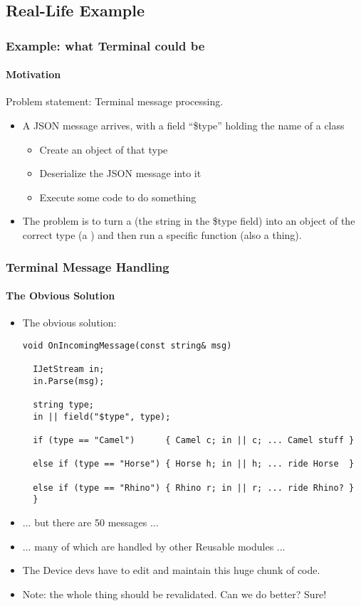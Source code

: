 \subsection{Real-Life Example}

\begin{frame}[fragile,t]
\frametitle{Example: what Terminal could be}
\framesubtitle{Motivation}
Problem statement: Terminal message processing.
\begin{itemize}[<+->]
\item A JSON message arrives, with a field ``\$type'' holding the name
  of a class
  \begin{itemize}
  \item Create an object of that type
  \item Deserialize the JSON message into it
  \item Execute some code to do something
  \end{itemize}
\item The problem is to turn a  (the string in the \$type
  field) into an object of the correct type (a ) and then run a specific function (also a
   thing).
\end{itemize}
\end{frame}

\begin{frame}[fragile,t]
\frametitle{Terminal Message Handling}
\framesubtitle{The Obvious Solution}
\begin{itemize}[<+->]
\item The obvious solution:
{\scriptsize\begin{verbatim}
void OnIncomingMessage(const string& msg)

  IJetStream in;    
  in.Parse(msg);

  string type;      
  in || field("$type", type);

  if (type == "Camel")      { Camel c; in || c; ... Camel stuff }

  else if (type == "Horse") { Horse h; in || h; ... ride Horse  }

  else if (type == "Rhino") { Rhino r; in || r; ... ride Rhino? }
  }
\end{verbatim}
}

\item ... but there are 50 messages ...
\item ... many of which are handled by other Reusable modules ...
\item The Device devs have to edit and maintain this huge chunk of
  code.
\item Note:  the whole thing should
  be revalidated.
\vskip 12pt Can we do better?  Sure!
\end{itemize}


\end{frame}




